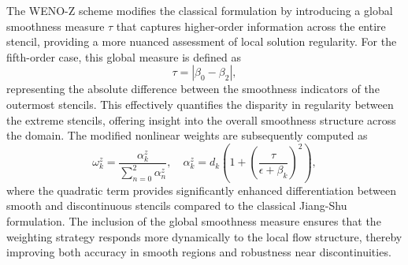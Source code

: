 The WENO-Z scheme modifies the classical formulation by introducing a global smoothness measure $\tau$ that captures higher-order information across the entire stencil, providing a more nuanced assessment of local solution regularity. For the fifth-order case, this global measure is defined as
\begin{equation}
\tau = |\beta_0 - \beta_2|,
\end{equation}
representing the absolute difference between the smoothness indicators of the outermost stencils. This effectively quantifies the disparity in regularity between the extreme stencils, offering insight into the overall smoothness structure across the domain. The modified nonlinear weights are subsequently computed as
\begin{equation}
\omega_k^z = \frac{\alpha_k^z}{\sum_{n=0}^{2} \alpha_n^z}, \quad \alpha_k^z = d_k \left(1 + \left(\frac{\tau}{\epsilon + \beta_k}\right)^2\right),
\end{equation}
where the quadratic term provides significantly enhanced differentiation between smooth and discontinuous stencils compared to the classical Jiang-Shu formulation. The inclusion of the global smoothness measure ensures that the weighting strategy responds more dynamically to the local flow structure, thereby improving both accuracy in smooth regions and robustness near discontinuities.

